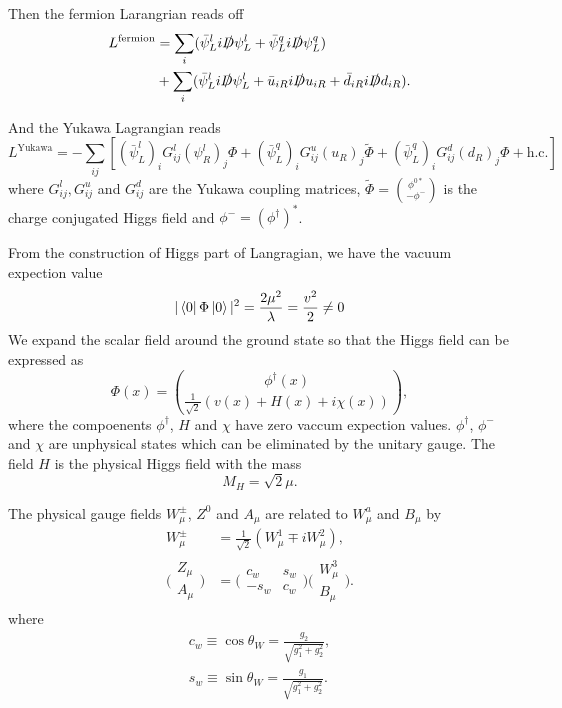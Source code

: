 Then the fermion Larangrian reads off
\begin{align}
L^\text{fermion}&=\sum_i (\bar{\psi}_L^l i\slashed{D} \psi_L^l+\bar{\psi}_L^q i\slashed{D} \psi_L^q)\nonumber\\
&+\sum_i (\bar{\psi}_L^l i\slashed{D} \psi_L^l + \bar{u}_{iR} i\slashed{D} u_{iR}+ \bar{d}_{iR} i\slashed{D} d_{iR}).
\end{align}

And the Yukawa Lagrangian reads 
\begin{equation}
L^\text{Yukawa}=-\sum_{ij}[(\bar{\psi}^l_L)_i G^l_{ij} (\psi^l_R)_j\Phi+(\bar{\psi}^q_L)_i G^u_{ij} (u_{R})_j\tilde{\Phi} + (\bar{\psi}^q_L)_i G^d_{ij} (d_{R})_j\Phi+\text{h.c.}]
\end{equation}
where $G^l_{ij}, G^u_{ij}$ and $G^d_{ij}$ are the Yukawa coupling matrices, $\tilde{\Phi}=\binom{\phi^{0\ast}}{-\phi^-}$ is the charge conjugated Higgs field and $\phi^-=(\phi^\dagger)^\ast$.

From the construction of Higgs part of Langragian, we have the vacuum expection value
\begin{equation}
|\bra{0}\Phi\ket{0}|^2=\frac{2\mu^2}{\lambda}=\frac{v^2}{2}\neq 0
\end{equation}
We expand the scalar field around the ground state so that the Higgs field can be expressed as 
\begin{equation}
\Phi(x)=\binom{\phi^\dagger(x)}{\frac{1}{\sqrt{2}}(v(x)+H(x)+i\chi(x))},
\end{equation}
where the compoenents $\phi^\dagger$, $H$ and $\chi$ have zero vaccum expection values. $\phi^\dagger$, $\phi^-$ and $\chi$ are unphysical states which can be eliminated by the unitary gauge. The field $H$ is the physical Higgs field with the mass 
\begin{equation}
M_H=\sqrt{2}\mu.
\end{equation}

The physical gauge fields $W^\pm_\mu$, $Z^0$ and $A_\mu$ are related to $W_\mu^a$ and $B_\mu$ by
\begin{align}
W^\pm_\mu&=\frac{1}{\sqrt{2}}(W^1_\mu\mp iW^2_\mu),\nonumber\\
\bigg(
\begin{array}{c}
Z_\mu\\A_\mu
\end{array}\bigg)
&=
\bigg(
\begin{array}{cc}
c_w & s_w\\-s_w &c_w
\end{array}
\bigg)
\bigg(
\begin{array}{c}
W^3_\mu\\B_\mu
\end{array}
\bigg).
\end{align}
where
\begin{align}
c_w\equiv\cos\theta_W=\frac{g_2}{\sqrt{g_1^2+g_2^2}},\nonumber\\
s_w\equiv\sin\theta_W=\frac{g_1}{\sqrt{g_1^2+g_2^2}}.
\end{align}


